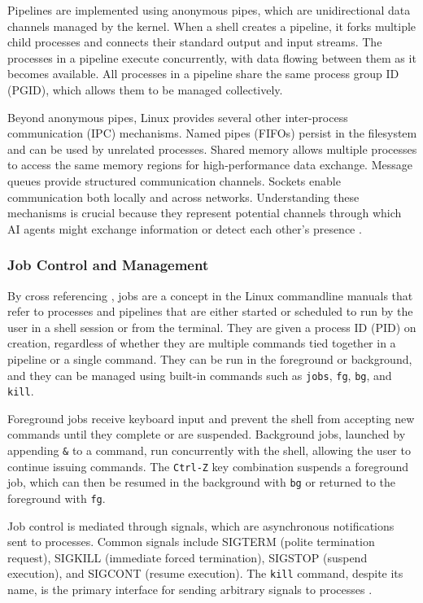 Pipelines are implemented using anonymous pipes, which are unidirectional data channels managed by the kernel. When a shell creates a pipeline, it forks multiple child processes and connects their standard output and input streams. The processes in a pipeline execute concurrently, with data flowing between them as it becomes available. All processes in a pipeline share the same process group ID (PGID), which allows them to be managed collectively.

Beyond anonymous pipes, Linux provides several other inter-process communication (IPC) mechanisms. Named pipes (FIFOs) persist in the filesystem and can be used by unrelated processes. Shared memory allows multiple processes to access the same memory regions for high-performance data exchange. Message queues provide structured communication channels. Sockets enable communication both locally and across networks. Understanding these mechanisms is crucial because they represent potential channels through which AI agents might exchange information or detect each other's presence \parencite[3.2.2]{GnuBashManual}.

\newpage
\subsubsection{Job Control and Management}
\label{JobControl}

By cross referencing \textcite{GnuBashManual,GFGJobSPEC,GFGJobScheduling,GFGCronCommand}, jobs are a concept in the Linux commandline manuals that refer to processes and pipelines that are either started or scheduled to run by the user in a shell session or from the terminal. They are given a process ID (PID) on creation, regardless of whether they are multiple commands tied together in a pipeline or a single command. They can be run in the foreground or background, and they can be managed using built-in commands such as \texttt{jobs}, \texttt{fg}, \texttt{bg}, and \texttt{kill}.

Foreground jobs receive keyboard input and prevent the shell from accepting new commands until they complete or are suspended. Background jobs, launched by appending \texttt{\&} to a command, run concurrently with the shell, allowing the user to continue issuing commands. The \texttt{Ctrl-Z} key combination suspends a foreground job, which can then be resumed in the background with \texttt{bg} or returned to the foreground with \texttt{fg}.

Job control is mediated through signals, which are asynchronous notifications sent to processes. Common signals include SIGTERM (polite termination request), SIGKILL (immediate forced termination), SIGSTOP (suspend execution), and SIGCONT (resume execution). The \texttt{kill} command, despite its name, is the primary interface for sending arbitrary signals to processes \parencite[7.1-7.3]{GnuBashManual}.

